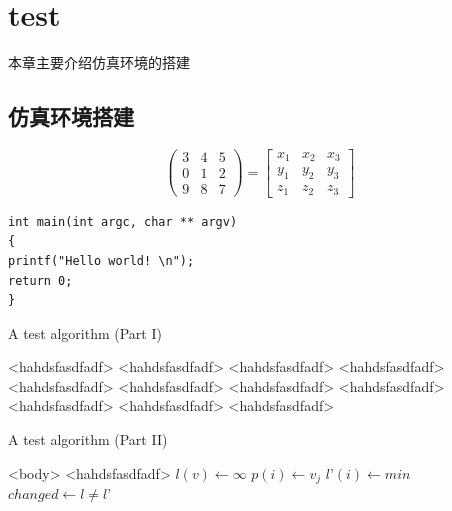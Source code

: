 \chapter{test}

本章主要介绍仿真环境的搭建

\section{仿真环境搭建}

\begin{equation}
\begin{pmatrix} 
3 & 4 & 5 \\
0 & 1 & 2 \\
9 & 8 & 7  
\end{pmatrix}=
\begin{bmatrix} 
x_1 & x_2 & x_3 \\
y_1 & y_2 & y_3 \\
z_1 & z_2 & z_3 
\end{bmatrix} 
\end{equation}

\begin{lstlisting}[language={[ANSI]C}] 
int main(int argc, char ** argv) 
{ 
printf("Hello world! \n"); 
return 0; 
} 
\end{lstlisting}

\begin{algorithm}
\caption{A test algorithm (Part I)}
\begin{algorithmic}[1]
\Require <hahdsfasdfadf>
\Ensure <hahdsfasdfadf>
\State <hahdsfasdfadf>
	\State <hahdsfasdfadf>
	\State <hahdsfasdfadf>
\Else 
	\State <hahdsfasdfadf>
\EndIf
{}
	\State <hahdsfasdfadf>
\EndFor
{}
	\State <hahdsfasdfadf>
\EndFor
{}
	\State <hahdsfasdfadf>
\EndWhile
\Repeat
	\State <hahdsfasdfadf>
\Loop
	\State <hahdsfasdfadf>
\EndLoop
\end{algorithmic}
\end{algorithm}

\begin{algorithm}
\caption*{A test algorithm (Part II)}
\begin{algorithmic}[1]
 <body> \EndFunction
\State \Return <hahdsfasdfadf>
\State $l(v) \leftarrow \infty$
\EndFor
\State $p(i) \leftarrow v_j$
\State $l’(i) \leftarrow min$
\State $changed \leftarrow l \not= l’$
\EndProcedure
\end{algorithmic}
\end{algorithm}

